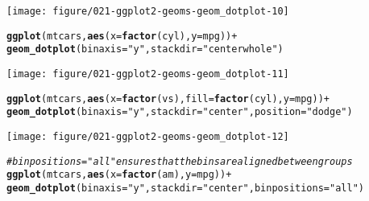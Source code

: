 \documentclass[a4paper,titlepage]{tufte-handout}\usepackage[]{graphicx}\usepackage[]{color}
\makeatletter
\def\maxwidth{ %
  \ifdim\Gin@nat@width>\linewidth
    \linewidth
  \else
    \Gin@nat@width
  \fi
}
\newcommand{\hlstr}[1]{\textcolor[rgb]{0.192,0.494,0.8}{#1}}%
\newcommand{\hlcom}[1]{\textcolor[rgb]{0.678,0.584,0.686}{\textit{#1}}}%
\newcommand{\hlopt}[1]{\textcolor[rgb]{0,0,0}{#1}}%
\newcommand{\hlstd}[1]{\textcolor[rgb]{0.345,0.345,0.345}{#1}}%
\newcommand{\hlkwc}[1]{\textcolor[rgb]{0.333,0.667,0.333}{#1}}%
\newcommand{\hlkwd}[1]{\textcolor[rgb]{0.737,0.353,0.396}{\textbf{#1}}}%
\newenvironment{kframe}{%
 \def\at@end@of@kframe{}%
 \ifinner\ifhmode%
  \def\at@end@of@kframe{\end{minipage}}%
  \begin{minipage}{\columnwidth}%
 \fi\fi%
 \def\FrameCommand##1{\hskip\@totalleftmargin \hskip-\fboxsep
 \colorbox{shadecolor}{##1}\hskip-\fboxsep
     \hskip-\linewidth \hskip-\@totalleftmargin \hskip\columnwidth}%
 \MakeFramed {\advance\hsize-\width
   \@totalleftmargin\z@ \linewidth\hsize
   \@setminipage}}%
 {\par\unskip\endMakeFramed%
 \at@end@of@kframe}
\newenvironment{knitrout}{}{} %
\makeatother
\begin{document}
\begin{knitrout}
\begin{kframe}
{\ttfamily\noindent\itshape\color{messagecolor}{\#\# `stat\_bindot()` using `bins = 30`. Pick better value with `binwidth`.}}\end{kframe}
\texttt{[image: figure/021-ggplot2-geoms-geom\_dotplot-10]} 
\begin{kframe}\begin{alltt}
\hlkwd{ggplot}\hlstd{(mtcars,} \hlkwd{aes}\hlstd{(}\hlkwc{x} \hlstd{=} \hlkwd{factor}\hlstd{(cyl),} \hlkwc{y} \hlstd{= mpg))} \hlopt{+}
  \hlkwd{geom_dotplot}\hlstd{(}\hlkwc{binaxis} \hlstd{=} \hlstr{"y"}\hlstd{,} \hlkwc{stackdir} \hlstd{=} \hlstr{"centerwhole"}\hlstd{)}
\end{alltt}


{\ttfamily\noindent\itshape\color{messagecolor}{\#\# `stat\_bindot()` using `bins = 30`. Pick better value with `binwidth`.}}\end{kframe}
\texttt{[image: figure/021-ggplot2-geoms-geom\_dotplot-11]} 
\begin{kframe}\begin{alltt}
\hlkwd{ggplot}\hlstd{(mtcars,} \hlkwd{aes}\hlstd{(}\hlkwc{x} \hlstd{=} \hlkwd{factor}\hlstd{(vs),} \hlkwc{fill} \hlstd{=} \hlkwd{factor}\hlstd{(cyl),} \hlkwc{y} \hlstd{= mpg))} \hlopt{+}
  \hlkwd{geom_dotplot}\hlstd{(}\hlkwc{binaxis} \hlstd{=} \hlstr{"y"}\hlstd{,} \hlkwc{stackdir} \hlstd{=} \hlstr{"center"}\hlstd{,} \hlkwc{position} \hlstd{=} \hlstr{"dodge"}\hlstd{)}
\end{alltt}


{\ttfamily\noindent\itshape\color{messagecolor}{\#\# `stat\_bindot()` using `bins = 30`. Pick better value with `binwidth`.}}\end{kframe}
\texttt{[image: figure/021-ggplot2-geoms-geom\_dotplot-12]} 
\begin{kframe}\begin{alltt}
\hlcom{# binpositions="all" ensures that the bins are aligned between groups}
\hlkwd{ggplot}\hlstd{(mtcars,} \hlkwd{aes}\hlstd{(}\hlkwc{x} \hlstd{=} \hlkwd{factor}\hlstd{(am),} \hlkwc{y} \hlstd{= mpg))} \hlopt{+}
  \hlkwd{geom_dotplot}\hlstd{(}\hlkwc{binaxis} \hlstd{=} \hlstr{"y"}\hlstd{,} \hlkwc{stackdir} \hlstd{=} \hlstr{"center"}\hlstd{,} \hlkwc{binpositions}\hlstd{=}\hlstr{"all"}\hlstd{)}
\end{alltt}



\end{kframe}
\end{knitrout}
\end{document}
